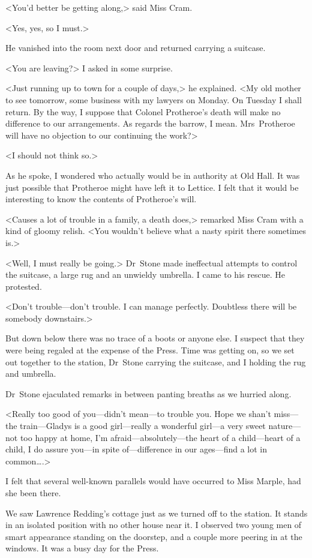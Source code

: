 <You'd better be getting along,> said Miss Cram.

<Yes, yes, so I must.>

He vanished into the room next door and returned carrying a suitcase.

<You are leaving?> I asked in some surprise.

<Just running up to town for a couple of days,> he explained. <My old mother to see tomorrow, some business with my lawyers on Monday. On Tuesday I shall return. By the way, I suppose that Colonel Protheroe's death will make no difference to our arrangements. As regards the barrow, I mean. Mrs~Protheroe will have no objection to our continuing the work?>

<I should not think so.>

As he spoke, I wondered who actually would be in authority at Old Hall. It was just possible that Protheroe might have left it to Lettice. I felt that it would be interesting to know the contents of Protheroe's will.

<Causes a lot of trouble in a family, a death does,> remarked Miss Cram with a kind of gloomy relish. <You wouldn't believe what a nasty spirit there sometimes is.>

<Well, I must really be going.> Dr~Stone made ineffectual attempts to control the suitcase, a large rug and an unwieldy umbrella. I came to his rescue. He protested.

<Don't trouble—don't trouble. I can manage perfectly. Doubtless there will be somebody downstairs.>

But down below there was no trace of a boots or anyone else. I suspect that they were being regaled at the expense of the Press. Time was getting on, so we set out together to the station, Dr~Stone carrying the suitcase, and I holding the rug and umbrella.

Dr~Stone ejaculated remarks in between panting breaths as we hurried along.

<Really too good of you—didn't mean—to trouble you. Hope we shan't miss—the train—Gladys is a good girl—really a wonderful girl—a very sweet nature—not too happy at home, I'm afraid—absolutely—the heart of a child—heart of a child, I do assure you—in spite of—difference in our ages—find a lot in common\dots.>

I felt that several well-known parallels would have occurred to Miss Marple, had she been there.

We saw Lawrence Redding's cottage just as we turned off to the station. It stands in an isolated position with no other house near it. I observed two young men of smart appearance standing on the doorstep, and a couple more peering in at the windows. It was a busy day for the Press.

